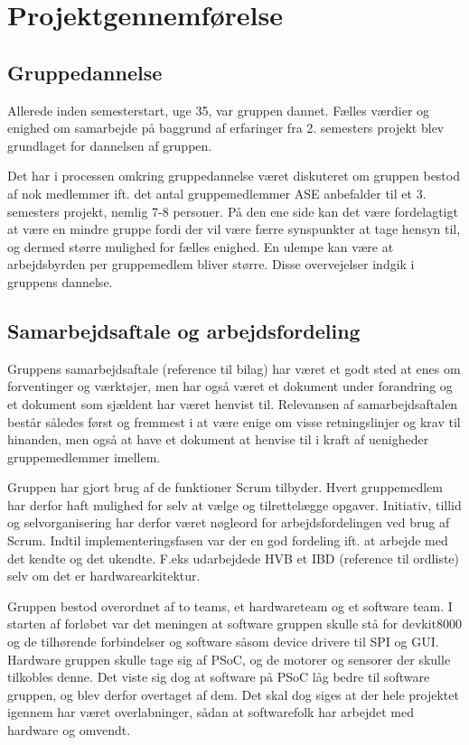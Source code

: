 ﻿\chapter*{Projektgennemførelse}
\section*{Gruppedannelse}
Allerede inden semesterstart, uge 35, var gruppen dannet. Fælles værdier og enighed om samarbejde på baggrund af erfaringer fra 2. semesters projekt blev grundlaget for dannelsen af gruppen.

Det har i processen omkring gruppedannelse været diskuteret om gruppen bestod af nok medlemmer ift. det antal gruppemedlemmer ASE anbefalder til et 3. semesters projekt, nemlig 7-8 personer. På den ene side kan det være fordelagtigt at være en mindre gruppe fordi der vil være færre synspunkter at tage hensyn til, og dermed større mulighed for fælles enighed. En ulempe kan være at arbejdsbyrden per gruppemedlem bliver større. Disse overvejelser indgik i gruppens dannelse.\\

\section*{Samarbejdsaftale og arbejdsfordeling}
Gruppens samarbejdsaftale (reference til bilag) har været et godt sted at enes om forventinger og værktøjer, men har også været et dokument under forandring og et dokument som sjældent har været henvist til. 
Relevansen af samarbejdsaftalen består således først og fremmest i at være enige om visse retningslinjer og krav til hinanden, men også at have et dokument at henvise til i kraft af uenigheder gruppemedlemmer imellem.

Gruppen har gjort brug af de funktioner Scrum tilbyder. Hvert gruppemedlem har derfor haft mulighed for selv at vælge og tilrettelægge opgaver. Initiativ, tillid og selvorganisering har derfor været nøgleord for arbejdsfordelingen ved brug af Scrum.
Indtil implementeringsfasen var der en god fordeling ift. at arbejde med det kendte og det ukendte. F.eks udarbejdede HVB et IBD (reference til ordliste) selv om det er hardwarearkitektur.

Gruppen bestod overordnet af to teams, et hardwareteam og et software team. I starten af forløbet var det meningen at software gruppen skulle stå for devkit8000 og de tilhørende forbindelser og software såsom device drivere til SPI og GUI. 
Hardware gruppen skulle tage sig af PSoC, og de motorer og sensorer der skulle tilkobles denne. Det viste sig dog at software på PSoC låg bedre til software gruppen, og blev derfor overtaget af dem. Det skal dog siges at der hele projektet igennem har været overlabninger, sådan at softwarefolk har arbejdet med hardware og omvendt.

